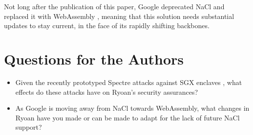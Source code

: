 \documentclass[11pt]{article}
\begin{document}
Not long after the publication of this paper, Google deprecated NaCl and replaced it with WebAssembly \cite{nacl}, meaning that this solution needs substantial updates to stay current, in the face of its rapidly shifting backbones. 

\section*{Questions for the Authors}

\begin{itemize}
	\item Given the recently prototyped Spectre attacks against SGX enclaves \cite{spectre}, what effects do these attacks have on Ryoan's security assurances?
	\item As Google is moving away from NaCl towards WebAssembly, what changes in Ryoan have you made or can be made to adapt for the lack of future NaCl support?
\end{itemize}


\footnotesize{}
\end{document}
